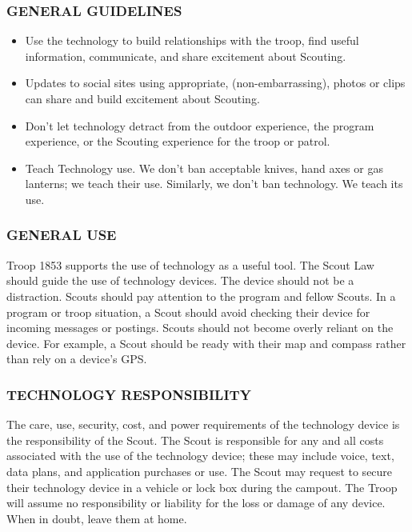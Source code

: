 \documentclass{ltxguide}
\begin{document}
\subsubsection{GENERAL GUIDELINES}

\begin{itemize}
	\item Use the technology to build relationships with the troop, find useful information, communicate, and share excitement about Scouting.
	\item Updates to social sites using appropriate, (non-embarrassing), photos or clips can share and build excitement about Scouting.
	\item Don't let technology detract from the outdoor experience, the program experience, or the Scouting experience for the troop or patrol.
	\item Teach Technology use. We don't ban acceptable knives, hand axes or gas lanterns; we teach their use. Similarly, we don't ban technology. We teach its use.
\end{itemize}

\subsubsection{GENERAL USE}
Troop 1853 supports the use of technology as a useful tool. The Scout Law should guide the use of technology devices. The device should not be a distraction. Scouts should pay attention to the program and fellow Scouts. In a program or troop situation, a Scout should avoid checking their device for incoming messages or postings. Scouts should not become overly reliant on the device. For example, a Scout should be ready with their map and compass rather than rely on a device's GPS.

\subsubsection{TECHNOLOGY RESPONSIBILITY}
The care, use, security, cost, and power requirements of the technology device is the responsibility of the Scout. The Scout is responsible for any and all costs associated with the use of the technology device; these may include voice, text, data plans, and application purchases or use. The Scout may request to secure their technology device in a vehicle or lock box during the campout. The Troop will assume no responsibility or liability for the loss or damage of any  device. When in doubt, leave them at home.
\end{document}
